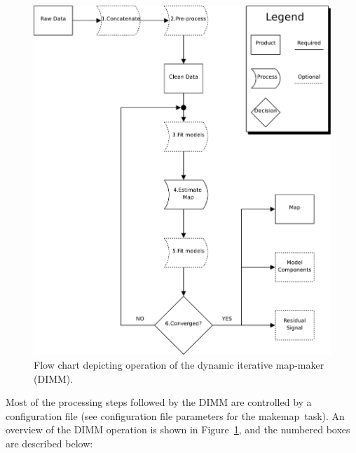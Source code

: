 \documentclass[twoside,11pt]{article}
\newcommand{\xref}[3]{#1}
\renewcommand{\_}{\texttt{\symbol{95}}}
\newcommand{\task}[1]{\textsf{#1}}
\newcommand{\makemap}{\xref{\task{makemap}}{sun258}{MAKEMAP}}
\begin{document}
\begin{figure}
\begin{center}
\includegraphics[width=\linewidth]{sun258_dimm_flow}
\caption{Flow chart depicting operation of the dynamic iterative
  map-maker (DIMM).}
\label{fig:dimm_flow}
\end{center}
\end{figure}

Most of the processing steps followed by the DIMM are controlled by a
configuration file (see configuration file parameters for the
\makemap\ task). An overview of the DIMM operation is shown in
Figure~\ref{fig:dimm_flow}, and the numbered boxes are described
below:
\end{document}
